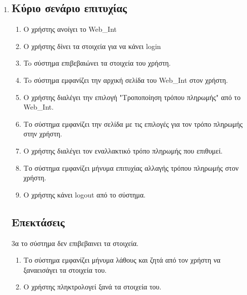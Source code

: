 \documentclass[12pt]{article}
\begin{document}
\begin{enumerate}
\newpage
\item
\subsection*{Κύριο σενάριο επιτυχίας}
\begin{enumerate}[label=\arabic*.]
\item
Ο χρήστης ανοίγει το \textlatin{Web\_Int}
\item
Ο χρήστης δίνει τα στοιχεία για να κάνει \textlatin{login}
\item
To σύστημα επιβεβαιώνει τα στοιχεία του χρήστη.
\item
To σύστημα εμφανίζει την αρχική σελίδα του \textlatin{Web\_Int} στον χρήστη.
\item
Ο χρήστης διαλέγει την επιλογή "Τροποποίηση τρόπου πληρωμής" 
από το \textlatin{Web\_Int}.
\item
Το σύστημα εμφανίζει την σελίδα με τις επιλογές για τον τρόπο 
πληρωμής στην χρήστη.
\item
Ο χρήστης διαλέγει τον εναλλακτικό τρόπο πληρωμής που επιθυμεί.
\item
Το σύστημα εμφανίζει μήνυμα επιτυχίας αλλαγής τρόπου πληρωμής 
στον χρήστη.
\item
Ο χρήστης κάνει \textlatin{logout} από το σύστημα.
\end{enumerate}

\subsection*{Επεκτάσεις}
3α το σύστημα δεν επιβεβαινει τα στοιχεία.
\begin{enumerate}[label=\arabic*.]
\item
Το σύστημα εμφανίζει μήνυμα λάθους και ζητά από τον 
χρήστη να ξαναεισάγει τα στοιχεία του.
\item 
Ο χρήστης πληκτρολογεί ξανά τα στοιχεία του.
\end{enumerate}


\end{enumerate}
\end{document}
